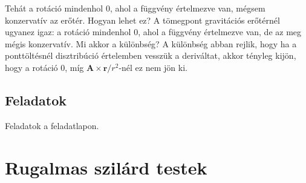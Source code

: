 \documentclass[12pt,a4paper]{scrartcl}
\let\mathbf\bm
\begin{document}
Tehát a rotáció mindenhol 0, ahol a függvény értelmezve van, mégsem konzervatív az erőtér. Hogyan lehet ez? A  tömegpont gravitációs erőtérnél ugyanez igaz: a rotáció mindenhol 0, ahol a függvény értelmezve van, de az meg mégis konzervatív. Mi akkor a különbség? A különbség abban rejlik, hogy ha a ponttöltésnél disztribúció értelemben vesszük a deriváltat, akkor tényleg kijön, hogy a rotáció 0, míg ${\mathbf{A}} \times {\mathbf{r}}/{r^2}$-nél ez nem jön ki.

\subsection{Feladatok}
Feladatok a feladatlapon.

\section{Rugalmas szilárd testek}
\end{document}
